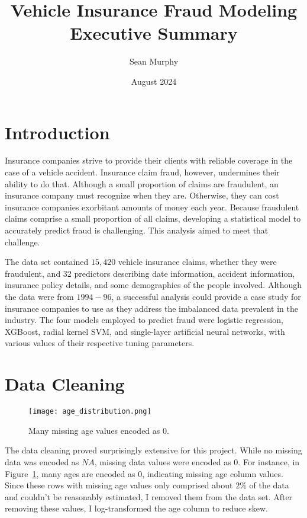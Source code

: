 \documentclass{article}
\title{Vehicle Insurance Fraud Modeling Executive Summary}
\author{Sean Murphy}
\date{August 2024}
\begin{document}
\maketitle

\section{Introduction}

Insurance companies strive to provide their clients with reliable coverage in the case of a vehicle 
accident.  Insurance claim fraud, however, undermines their ability to do that.  Although a small 
proportion of claims are fraudulent, an insurance company must recognize when they are.  Otherwise, 
they can cost insurance companies exorbitant amounts of money each year.  Because fraudulent claims 
comprise a small proportion of all claims, developing a statistical model to accurately predict 
fraud is challenging.  This analysis aimed to meet that challenge.   

The data set contained $15,420$ vehicle insurance claims, whether they were fraudulent, and 32 
predictors describing date information, accident information, insurance policy details, and some 
demographics of the people involved.  Although the data were from $1994-96$, a successful analysis 
could provide a case study for insurance companies to use as they address the imbalanced data 
prevalent in the industry.  The four models employed to predict fraud were logistic regression, 
XGBoost, radial kernel SVM, and single-layer artificial neural networks, with various values of 
their respective tuning parameters. 

\section{Data Cleaning}

\begin{figure}
    \centering
    \texttt{[image: age\_distribution.png]}
    \caption{Many missing age values encoded as 0.}
    \label{fig:age_dist}
\end{figure}

The data cleaning proved surprisingly extensive for this project.  While no missing data was encoded 
as $NA$, missing data values were encoded as 0.  For instance, in Figure~\ref{fig:age_dist}, many 
ages are encoded as $0$, indicating missing age column values.  Since these rows with missing age 
values only comprised about $2\%$ of the data and couldn't be reasonably estimated, I removed them 
from the data set.  After removing these values, I log-transformed the age column to reduce skew.  
\end{document}
